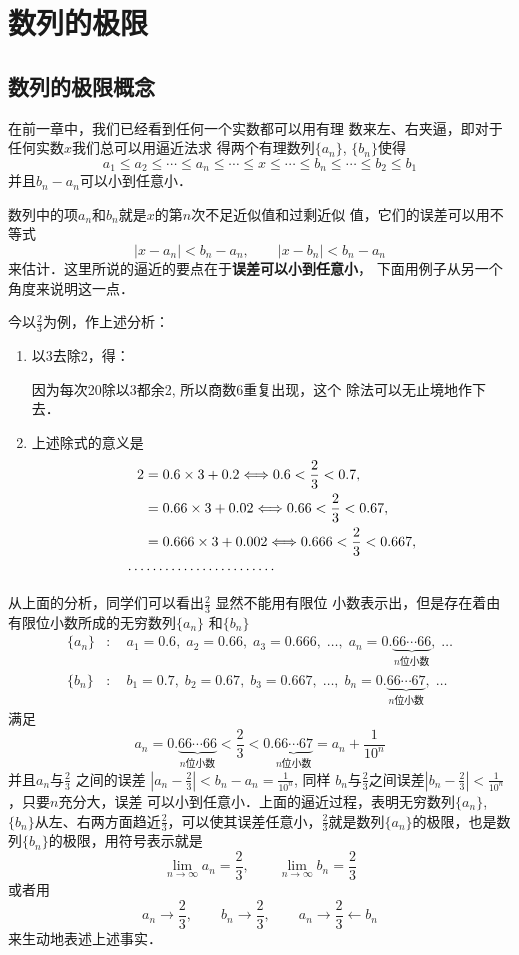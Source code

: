 \chapter{数列的极限}

\section{数列的极限概念}
在前一章中，我们已经看到任何一个实数都可以用有理
数来左、右夹逼，即对于任何实数$x$我们总可以用逼近法求
得两个有理数列$\{a_n\}$, $\{b_n\}$使得
\[a_1\le a_2\le \cdots \le a_n\le \cdots\le x\le \cdots\le b_n\le \cdots\le b_2\le b_1\]
并且$b_n-a_n$可以小到任意小．

数列中的项$a_n$和$b_n$就是$x$的第$n$次不足近似值和过剩近似
值，它们的误差可以用不等式
\[|x-a_n|<b_n-a_n,\qquad |x-b_n|<b_n-a_n\]
来估计．这里所说的逼近的要点在于\textbf{误差可以小到任意小}，
下面用例子从另一个角度来说明这一点．

今以$\frac{2}{3}$为例，作上述分析：
\begin{enumerate}
    \item 以3去除2，得：
    \begin{center}
    \end{center}
    因为每次20除以3都余2, 所以商数6重复出现，这个
    除法可以无止境地作下去．
    \item 上述除式的意义是
\[\begin{split}
    2&=0.6\times3+0.2\Longleftrightarrow 0.6<
\dfrac{2}{3}<0.7,\\
&=0.66\times3+0.02\Longleftrightarrow 0.66<
\dfrac{2}{3}<0.67,\\
&=0.666\times3+0.002\Longleftrightarrow 0.666<
\dfrac{2}{3}<0.667,\\
\cdots &\cdots\cdots\cdots\cdots\cdots\cdots\cdots
\end{split}\]
\end{enumerate}

从上面的分析，同学们可以看出$\frac{2}{3}$
显然不能用有限位
小数表示出，但是存在着由有限位小数所成的无穷数列$\{a_n\}$
和$\{b_n\}$
\[\begin{split}
    \{a_n\}&:\quad a_1=0.6,\; a_2=0.66,\; a_3=0.666,\; \ldots ,\; a_n=0.\underbrace{66\cdots66}_{\text{$n$位小数}},\; \ldots\\
    \{b_n\}&:\quad b_1=0.7,\; b_2=0.67,\; b_3=0.667,\; \ldots ,\; b_n=0.\underbrace{66\cdots67}_{\text{$n$位小数}},\; \ldots
\end{split}\]
满足 
\[a_n=0.\underbrace{66\cdots66}_{\text{$n$位小数}}<\frac{2}{3}<0.\underbrace{66\cdots67}_{\text{$n$位小数}}=a_n+\frac{1}{10^n}\]
并且$a_n$与$\frac{2}{3}$
之间的误差
$\left|a_n-\frac{2}{3}\right|<b_n-a_n=\frac{1}{10^n}$, 同样
$b_n$与$\frac{2}{3}$之间误差$\left|b_n-\frac{2}{3}\right|<\frac{1}{10^n}$，只要$n$充分大，误差
可以小到任意小．上面的逼近过程，表明无穷数列$\{a_n\}$, $\{b_n\}$从左、右两方面趋近$\frac{2}{3}$，可以使其误差任意小，$\frac{2}{3}$就是数列$\{a_n\}$的极限，也是数列$\{b_n\}$的极限，用符号表示就是
\[\lim_{n\to\infty}a_n=\frac{2}{3},\qquad \lim_{n\to\infty}b_n=\frac{2}{3}\]
或者用
\[a_n\to \frac{2}{3},\qquad b_n\to\frac{2}{3},\qquad a_n\to \frac{2}{3}\leftarrow b_n\]
来生动地表述上述事实．

